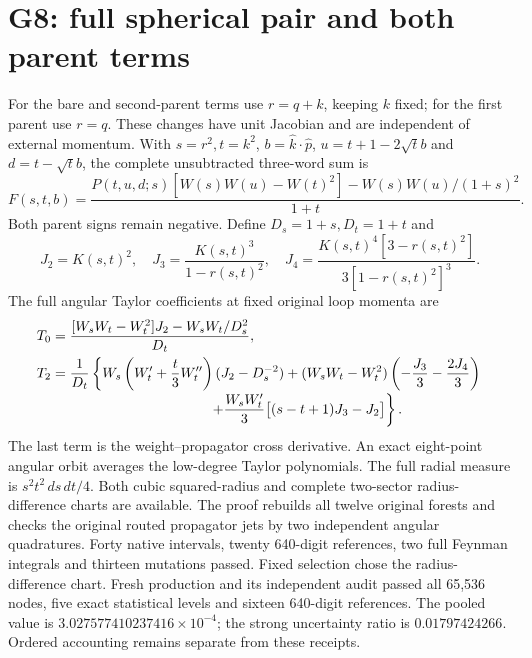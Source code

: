 \documentclass[11pt]{article}
\begin{document}
\section*{G8: full spherical pair and both parent terms}
For the bare and second-parent terms use $r=q+k$, keeping $k$ fixed;
for the first parent use $r=q$. These changes have unit Jacobian and
are independent of external momentum. With $s=r^2,t=k^2$,
$b=\widehat k\cdot\widehat p$, $u=t+1-2\sqrt t b$ and
$d=t-\sqrt t b$, the complete unsubtracted three-word sum is
\[
 F(s,t,b)=\frac{
 P(t,u,d;s)[W(s)W(u)-W(t)^2]-W(s)W(u)/(1+s)^2}{1+t}.
\]
Both parent signs remain negative. Define $D_s=1+s,D_t=1+t$ and
\[
 J_2=K(s,t)^2,\quad J_3=\frac{K(s,t)^3}{1-r(s,t)^2},\quad
 J_4=\frac{K(s,t)^4[3-r(s,t)^2]}{3[1-r(s,t)^2]^3}.
\]
The full angular Taylor coefficients at fixed original loop momenta are
\begin{align*}
 T_0={}&\frac{[W_sW_t-W_t^2]J_2-W_sW_t/D_s^2}{D_t},\\
 T_2={}&\frac1{D_t}\left\{
 W_s\left(W'_t+\frac t3W''_t\right)(J_2-D_s^{-2})
 +(W_sW_t-W_t^2)\left(-\frac{J_3}3-\frac{2J_4}3\right)
 \right.\\[-2pt]
 &\hspace{35mm}\left.
 +\frac{W_sW'_t}{3}\big[(s-t+1)J_3-J_2\big]\right\}.
\end{align*}
The last term is the weight--propagator cross derivative. An exact
eight-point angular orbit averages the low-degree Taylor polynomials.
The full radial measure is $s^2t^2\,ds\,dt/4$. Both cubic squared-radius
and complete two-sector radius-difference charts are available.
The proof rebuilds all twelve original forests and checks the original
routed propagator jets by two independent angular quadratures.
Forty native intervals, twenty 640-digit references, two full Feynman
integrals and thirteen mutations passed. Fixed selection chose the
radius-difference chart. Fresh production and its independent audit
passed all 65,536 nodes, five exact statistical levels and sixteen
640-digit references. The pooled value is
$3.027577410237416\times10^{-4}$; the strong uncertainty ratio is
$0.01797424266$. Ordered accounting remains separate from these receipts.
\end{document}
